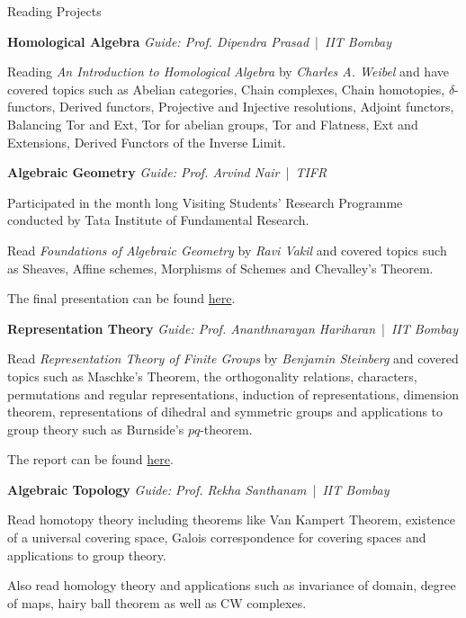 \begin{rubric}{Reading Projects}

\entry*[2021] \textbf{Homological Algebra} \hfill \emph{Guide: Prof. Dipendra Prasad} \,|\, \emph{IIT Bombay}

	Reading \emph{An Introduction to Homological Algebra} by \emph{Charles A. Weibel} and have covered topics such as Abelian categories, Chain complexes, Chain homotopies, $\delta$-functors, Derived functors, Projective and Injective resolutions, Adjoint functors, Balancing Tor and Ext, Tor for abelian groups, Tor and Flatness, Ext and Extensions, Derived Functors of the Inverse Limit.

\entry*[2021] \textbf{Algebraic Geometry} \hfill \emph{Guide: Prof. Arvind Nair} \,|\, \emph{TIFR}

	Participated in the month long Visiting Students' Research Programme conducted by Tata Institute of Fundamental Research. 

	Read \emph{Foundations of Algebraic Geometry} by \emph{Ravi Vakil} and covered topics such as Sheaves, Affine schemes, Morphisms of Schemes	and Chevalley's Theorem. 

	The final presentation can be found \href{https://aryamanmaithani.github.io/math/alg-geo/}{here}.

\entry*[2021] \textbf{Representation Theory} \hfill \emph{Guide: Prof. Ananthnarayan Hariharan} \,|\, \emph{IIT Bombay}
	
	Read \emph{Representation Theory of Finite Groups} by \emph{Benjamin Steinberg} and covered topics such as Maschke's Theorem, the orthogonality relations, characters, permutations and regular representations, induction of representations, dimension theorem, representations of dihedral and symmetric groups and applications to group theory such as Burnside's $pq$-theorem. 

	The report can be found \href{https://aryamanmaithani.github.io/math/rep-theory/Notes.pdf}{here}.

\entry*[2020] \textbf{Algebraic Topology}  \hfill \emph{Guide: Prof. Rekha Santhanam} \,|\, \emph{IIT Bombay}

	Read homotopy theory including theorems like Van Kampert Theorem, existence of a universal covering space, Galois correspondence for covering spaces and applications to group theory.

	Also read homology theory and applications such as invariance of domain, degree of maps, hairy ball theorem as well as CW complexes.


\end{rubric}
